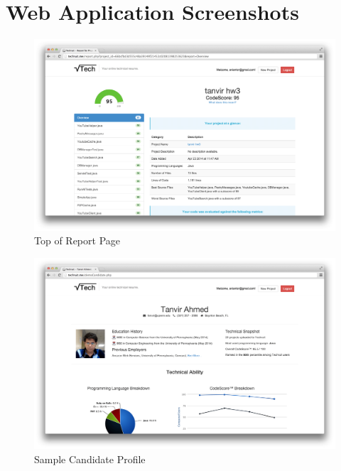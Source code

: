 \documentclass{sig-alternate}
\begin{document}
\vspace{175pt}
\appendix
\section{Web Application Screenshots}
\begin{figure}
	\begin{center}
		\includegraphics[width=500px]{report_overview1}
	\end{center}
	\vspace{-12pt}
	\caption{Top of Report Page}
	\label{fig:report1}
\end{figure}

\vspace{50pt}
\begin{figure}
	\begin{center}
		\includegraphics[width=500px]{sample_candidate}
	\end{center}
	\vspace{-12pt}
	\caption{Sample Candidate Profile}
	\label{fig:candidate}
\end{figure}
\end{document}
